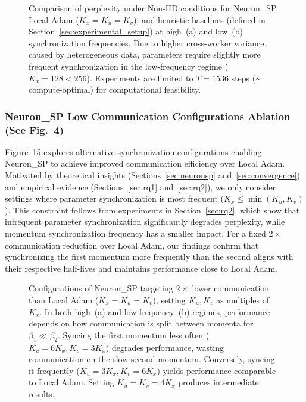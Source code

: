 \documentclass{article}
\begin{document}
\begin{figure}[ht]
\centering
\caption{Comparison of perplexity under Non-IID conditions for Neuron\_SP, Local Adam ($K_x=K_u=K_v$), and heuristic baselines (defined in Section~\ref{sec:experimental_setup}) at high~(a) and low~(b) synchronization frequencies. Due to higher cross-worker variance caused by heterogeneous data, parameters require slightly more frequent synchronization in the low-frequency regime ($K_x=128<256$). Experiments are limited to $T=1536$ steps ($\sim$compute-optimal) for computational feasibility.}
\label{fig:14}
\end{figure}

\subsubsection{Neuron\_SP Low Communication Configurations Ablation (See Fig.~4)}
\label{sec:b33_ablation}

Figure~15 explores alternative synchronization configurations enabling Neuron\_SP to achieve improved communication efficiency over Local Adam. Motivated by theoretical insights (Sections~\ref{sec:neuronsp} and~\ref{sec:convergence}) and empirical evidence (Sections~\ref{sec:rq1} and~\ref{sec:rq2}), we only consider settings where parameter synchronization is most frequent ($K_x \leq \min(K_u, K_v)$). This constraint follows from experiments in Section~\ref{sec:rq2}, which show that infrequent parameter synchronization significantly degrades perplexity, while momentum synchronization frequency has a smaller impact. For a fixed $2\times$ communication reduction over Local Adam, our findings confirm that synchronizing the first momentum more frequently than the second aligns with their respective half-lives and maintains performance close to Local Adam.

\begin{figure}[ht]
\centering
\caption{Configurations of Neuron\_SP targeting $2\times$ lower communication than Local Adam ($K_x=K_u=K_v$), setting $K_u, K_v$ as multiples of $K_x$. In both high~(a) and low-frequency~(b) regimes, performance depends on how communication is split between momenta for $\beta_1 \ll \beta_2$. Syncing the first momentum less often ($K_u=6K_x, K_v=3K_x$) degrades performance, wasting communication on the slow second momentum. Conversely, syncing it frequently ($K_u=3K_x, K_v=6K_x$) yields performance comparable to Local Adam. Setting $K_u=K_v=4K_x$ produces intermediate results.}
\label{fig:15}
\end{figure}
\end{document}
